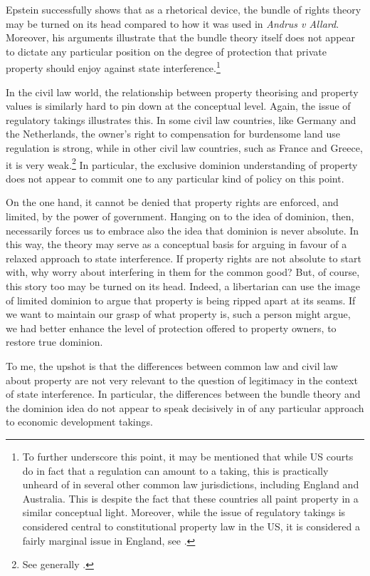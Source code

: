 Epstein successfully shows that as a rhetorical device, the bundle of rights theory may be turned on its head compared to how it was used in {\it Andrus v Allard}. Moreover, his arguments illustrate that the bundle theory itself does not appear to dictate any particular position on the degree of protection that private property should enjoy against state interference.\footnote{To further underscore this point, it may be mentioned that while US courts do in fact  that a regulation can amount to a taking, this is practically unheard of in several other common law jurisdictions, including England and Australia. This is despite the fact that these countries all paint property in a similar conceptual light. Moreover, while the issue of regulatory takings is considered central to constitutional property law in the US, it is considered a fairly marginal issue in England, see \cite{purdue10}.}

In the civil law world, the relationship between property theorising and property values is similarly hard to pin down at the conceptual level. Again, the issue of regulatory takings illustrates this. In some civil law countries, like Germany and the Netherlands, the owner's right to compensation for burdensome land use regulation is strong, while in other civil law countries, such as France and Greece, it is very weak.\footnote{See generally \cite{alterman10}.} In particular, the exclusive dominion understanding of property does not appear to commit one to any particular kind of policy on this point. 

On the one hand, it cannot be denied that property rights are enforced, and limited, by the power of government. Hanging on to the idea of dominion, then, necessarily forces us to embrace also the idea that dominion is never absolute. In this way, the theory may serve as a conceptual basis for arguing in favour of a relaxed approach to state interference. If property rights are not absolute to start with, why worry about interfering in them for the common good? But, of course, this story too may be turned on its head. Indeed, a libertarian can use the image of limited dominion to argue that property is being ripped apart at its seams. If we want to maintain our grasp of what property is, such a person might argue, we had better enhance the level of protection offered to property owners, to restore true dominion.

To me, the upshot is that the differences between common law and civil law  about property are not very relevant to the question of legitimacy in the context of state interference. In particular, the differences between the bundle theory and the dominion idea do not appear to speak decisively in  of any particular approach to economic development takings.

